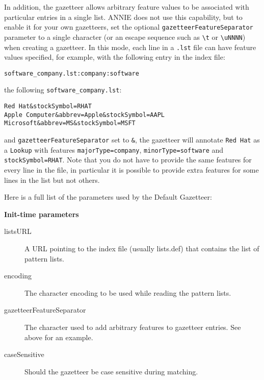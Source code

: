 In addition, the gazetteer allows arbitrary feature values to be associated
with particular entries in a single list.  ANNIE does not use this capability,
but to enable it for your own gazetteers, set the optional
{\tt gazetteerFeatureSeparator} parameter to a single character (or an escape
sequence such as \verb|\t| or \verb|\uNNNN|) when creating a gazetteer.  In
this mode, each line in a {\tt .lst} file can have feature values specified,
for example, with the following entry in the index file:
\begin{small}\begin{verbatim}
software_company.lst:company:software
\end{verbatim}\end{small}
%
the following \verb|software_company.lst|:
\begin{small}\begin{verbatim}
Red Hat&stockSymbol=RHAT
Apple Computer&abbrev=Apple&stockSymbol=AAPL
Microsoft&abbrev=MS&stockSymbol=MSFT
\end{verbatim}\end{small}
%
and {\tt gazetteerFeatureSeparator} set to \verb|&|, the gazetteer will
annotate \verb|Red Hat| as a \verb|Lookup| with features
\verb|majorType=company|, \verb|minorType=software| and
\verb|stockSymbol=RHAT|.  Note that you do not have to provide the same
features for every line in the file, in particular it is possible to provide
extra features for some lines in the list but not others.

Here is a full list of the parameters used by the Default Gazetteer:

{\bf Init-time parameters}
\begin{description}
\item[listsURL] A URL pointing to the index file (usually lists.def) that 
contains the list of pattern lists. 
\item[encoding] The character encoding to be used while reading the pattern 
lists.
\item[gazetteerFeatureSeparator] The character used to add arbitrary features 
to gazetteer entries. See above for an example.
\item[caseSensitive] Should the gazetteer be case sensitive during matching.
\end{description}

